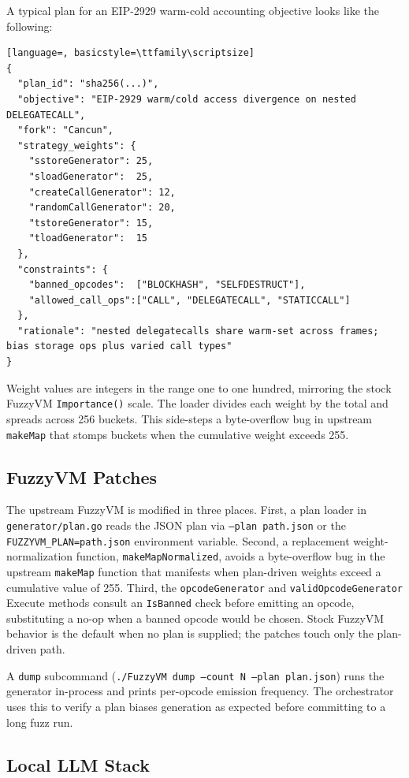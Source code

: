 \documentclass[conference]{IEEEtran}
\begin{document}
A typical plan for an EIP-2929 warm-cold accounting objective looks like the following:

\begin{lstlisting}[language=, basicstyle=\ttfamily\scriptsize]
{
  "plan_id": "sha256(...)",
  "objective": "EIP-2929 warm/cold access divergence on nested DELEGATECALL",
  "fork": "Cancun",
  "strategy_weights": {
    "sstoreGenerator": 25,
    "sloadGenerator":  25,
    "createCallGenerator": 12,
    "randomCallGenerator": 20,
    "tstoreGenerator": 15,
    "tloadGenerator":  15
  },
  "constraints": {
    "banned_opcodes":  ["BLOCKHASH", "SELFDESTRUCT"],
    "allowed_call_ops":["CALL", "DELEGATECALL", "STATICCALL"]
  },
  "rationale": "nested delegatecalls share warm-set across frames; bias storage ops plus varied call types"
}
\end{lstlisting}

Weight values are integers in the range one to one hundred, mirroring the stock FuzzyVM \texttt{Importance()} scale. The loader divides each weight by the total and spreads across 256 buckets. This side-steps a byte-overflow bug in upstream \texttt{makeMap} that stomps buckets when the cumulative weight exceeds 255.

\subsection{FuzzyVM Patches}

The upstream FuzzyVM is modified in three places. First, a plan loader in \texttt{generator/plan.go} reads the JSON plan via \texttt{--plan path.json} or the \texttt{FUZZYVM\_PLAN=path.json} environment variable. Second, a replacement weight-normalization function, \texttt{makeMapNormalized}, avoids a byte-overflow bug in the upstream \texttt{makeMap} function that manifests when plan-driven weights exceed a cumulative value of 255. Third, the \texttt{opcodeGenerator} and \texttt{validOpcodeGenerator} Execute methods consult an \texttt{IsBanned} check before emitting an opcode, substituting a no-op when a banned opcode would be chosen. Stock FuzzyVM behavior is the default when no plan is supplied; the patches touch only the plan-driven path.

A \texttt{dump} subcommand (\texttt{./FuzzyVM dump --count N --plan plan.json}) runs the generator in-process and prints per-opcode emission frequency. The orchestrator uses this to verify a plan biases generation as expected before committing to a long fuzz run.

\subsection{Local LLM Stack}
\end{document}
